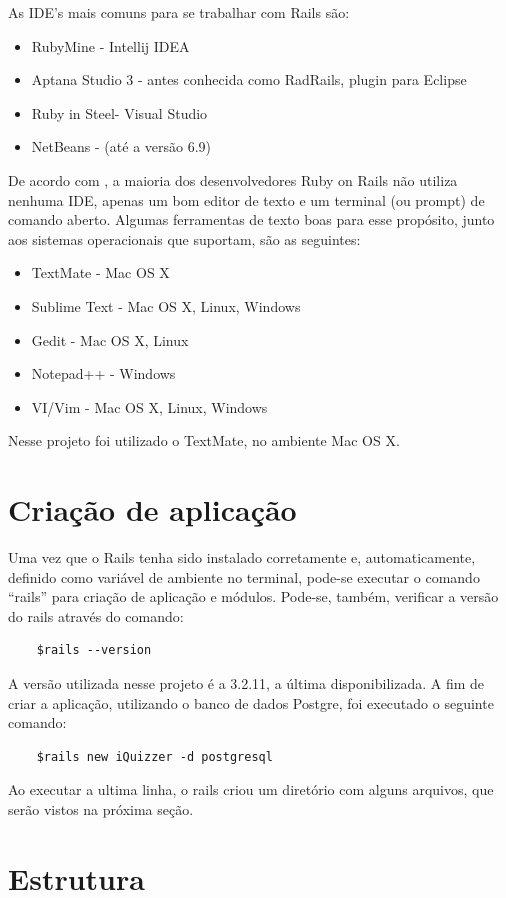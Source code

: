     As IDE's mais comuns para se trabalhar com Rails são:
\begin{itemize}
\item RubyMine - Intellij IDEA
\item Aptana Studio 3 - antes conhecida como RadRails, plugin para Eclipse
\item Ruby in Steel- Visual Studio
\item NetBeans - (até a versão 6.9)
\end{itemize}     
    De acordo com \cite{caelum}, a maioria dos desenvolvedores Ruby on Rails não utiliza nenhuma \ac{IDE}, apenas um bom editor de texto e um terminal (ou prompt) de comando aberto.  Algumas ferramentas de texto boas para esse propósito, junto aos sistemas operacionais que suportam, são as seguintes:
\begin{itemize}
\item TextMate -  Mac OS X
\item Sublime Text - Mac OS X, Linux, Windows
\item Gedit - Mac OS X, Linux
\item Notepad++ - Windows
\item VI/Vim - Mac OS X, Linux, Windows
\end{itemize}
    Nesse projeto foi utilizado o TextMate, no ambiente Mac OS X.
    \section{Criação de aplicação}
            Uma vez que o Rails tenha sido instalado corretamente e, automaticamente, definido como variável de ambiente no terminal, pode-se executar o comando ``rails'' para criação de aplicação e módulos.  Pode-se, também,  verificar a versão do rails através do comando:
			
\begin{lstlisting}
    $rails --version
\end{lstlisting}
           
    A versão utilizada nesse projeto é a 3.2.11, a última disponibilizada. A fim de criar a aplicação, utilizando o banco de dados Postgre, foi executado o seguinte comando:
	\begin{lstlisting}
    $rails new iQuizzer -d postgresql
    \end{lstlisting}   
    Ao executar a ultima linha, o rails criou um diretório com alguns arquivos, que serão vistos na próxima seção.
     
    \section{Estrutura}
           
